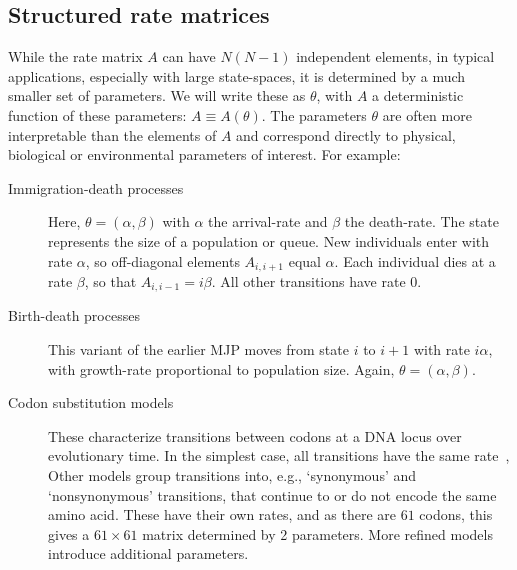 \subsection{Structured rate matrices}
While the rate matrix $A$ can have $N(N-1)$ independent elements,
in typical applications, especially with large state-spaces, 
it is determined by a much smaller
set of parameters. We will write these as $\theta$, with
$A$ a deterministic function of these parameters: 
$A \equiv A(\theta)$. The parameters $\theta$ are often more 
interpretable than the elements of $A$ and correspond directly to
physical, biological or environmental parameters of interest. 
For example:
\begin{description}
  \item[Immigration-death processes] Here, $\theta = (\alpha,\beta)$
    with $\alpha$ the arrival-rate and $\beta$ the death-rate.
    The state represents the size of a 
    population or queue. New individuals
    enter with rate $\alpha$,
    so off-diagonal elements $A_{i,i+1}$ equal $\alpha$.
    Each individual dies %
    at a rate $\beta$, so that %
    $A_{i,i-1}=i\beta$.
    All other transitions have rate $0$. 
  \item[Birth-death processes] This variant of the
    earlier MJP moves from state $i$ 
    to $i+1$ with rate $i\alpha$, with growth-rate proportional to 
    population size. Again, 
    $\theta=(\alpha,\beta)$.
  \item[Codon substitution models] These %
    characterize transitions between codons at a 
    DNA locus %
    over evolutionary time. In the simplest case,
    all transitions have the same rate~\cite{jukescantor69}, 
    Other models group transitions 
    into, e.g., `synonymous' and `nonsynonymous' transitions, 
    that continue to or do not encode the same amino acid. 
    These have their own rates, and as 
    there are $61$ codons, this gives a 
    $61\times 61$ matrix determined by 2 parameters. More refined 
    models~\cite{goldman1994codon} introduce additional parameters. 
\end{description}
